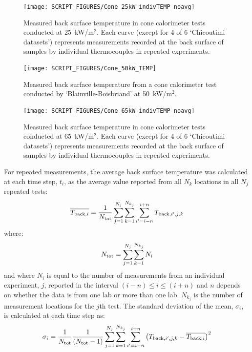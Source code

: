 \documentclass{book}
\begin{document}
\begin{figure}[p]
  \centering
  \texttt{[image: SCRIPT\_FIGURES/Cone\_25kW\_indivTEMP\_noavg]}
  \caption{Measured back surface temperature in cone calorimeter tests conducted at 25~kW/m$^2$. Each curve (except for 4 of 6 ‘Chicoutimi datasets’) represents measurements recorded at the back surface of samples by individual thermocouples in repeated experiments.}
  \label{Fig:Cone_25kWindivTEMP}
\end{figure}

\begin{figure}
  \centering
  \texttt{[image: SCRIPT\_FIGURES/Cone\_50kW\_TEMP]}
  \caption{Measured back surface temperature from a cone calorimeter test conducted by ‘Blainville-Boisbriand’ at 50~kW/m$^2$.}
  \label{Fig:Cone_50kWindivTEMP}
\end{figure}

\begin{figure}
  \centering
  \texttt{[image: SCRIPT\_FIGURES/Cone\_65kW\_indivTEMP\_noavg]}
  \caption{Measured back surface temperature in cone calorimeter tests conducted at 65~kW/m$^2$. Each curve (except for 4 of 6 ‘Chicoutimi datasets’) represents measurements recorded at the back surface of samples by individual thermocouples in repeated experiments.}
  \label{Fig:Cone_65kWindivTEMP}
\end{figure}


For repeated measurements, the average back surface temperature was calculated at each time step, $t_i$, as the average value reported from all $N_k$ locations in all $N_j$ repeated tests:
\begin{equation}
  \overline{ T_{{\rm back},i} } = \frac{1}{N_{\rm tot}} \sum_{j=1}^{N_j} \sum_{k=1}^{N_{k_j}} \sum_{i'=i-n}^{i+n} T_{{\rm back},i',j,k} 
\end{equation}
where:
\begin{equation}
N_{\rm tot}={\sum_{j=1}^{N_j}\sum_{k=1}^{N_{k_j}}N_i}
\end{equation}
and where $N_i$ is equal to the number of measurements from an individual experiment, $j$, reported in the interval $(i-n) \leq i \leq (i+n)$ and $n$ depends on whether the data is from one lab or more than one lab. $N_{k_j}$ is the number of measurement locations for the $j$th test. The standard deviation of the mean, $\sigma_i$, is calculated at each time step as:
\begin{equation}
   \sigma_i = \frac{1}{N_{\rm tot}} \frac{1}{(N_{\rm tot}-1)}
    \sum_{j=1}^{N_j} \sum_{k=1}^{N_{k_j}} \sum_{i'=i-n}^{i+n} \left( T_{{\rm back},i',j,k} - \overline{ T_{{\rm back},i} }  \right)^2
\end{equation}
\end{document}
